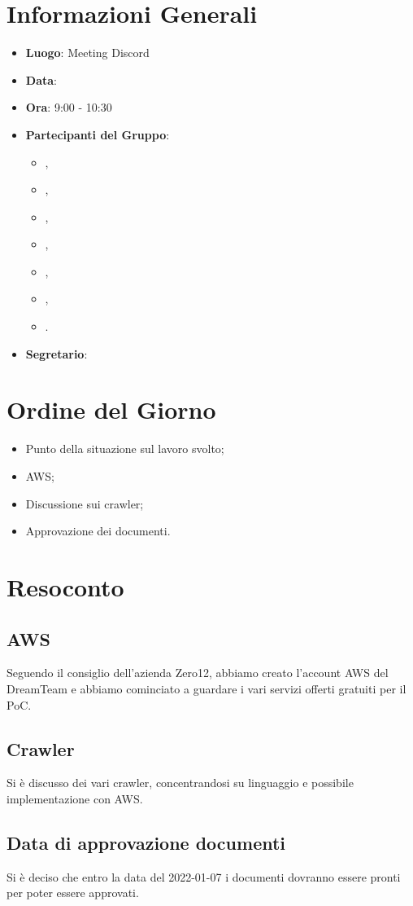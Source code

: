 \section{Informazioni Generali}

\begin{itemize}
\item{\textbf{Luogo}}: Meeting Discord
\item{\textbf{Data}}: \D{}
\item{\textbf{Ora}}: 9:00 - 10:30
\item{\textbf{Partecipanti del Gruppo}}: 
	\begin{itemize}
	\item{\EP{},} 
	\item{\FP{},}
	\item{\GC{},}
	\item{\LW{},}
	\item{\MB{},}
	\item{\MG{},}
	\item{\PV{}.}
	\end{itemize} 
\item{\textbf{Segretario}}: \PV{}	
\end{itemize}

\section{Ordine del Giorno}
\begin{itemize}
\item{Punto della situazione sul lavoro svolto;}
\item{AWS;}
\item{Discussione sui crawler;}
\item{Approvazione dei documenti.}
\end{itemize}

\section{Resoconto}

\subsection{AWS}
Seguendo il consiglio dell'azienda Zero12, abbiamo creato l'account AWS del DreamTeam e abbiamo cominciato a guardare i vari servizi offerti gratuiti per il PoC.

\subsection{Crawler}
Si è discusso dei vari crawler, concentrandosi su linguaggio e possibile implementazione con AWS.

\subsection{Data di approvazione documenti}
Si è deciso che entro la data del 2022-01-07 i documenti dovranno essere pronti per poter essere approvati.
